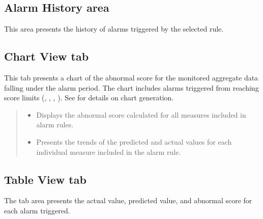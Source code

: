 \documentclass[letterpaper,10pt,english]{sphinxmanual}
\begin{document}
\subsection{Alarm History area}
\label{\detokenize{anomaly/part05/index:alarm-history}}
This area presents the history of alarms triggered by the selected rule.
\begin{quote}

\begin{figure}[H]
\centering

\noindent{}
\end{figure}
\end{quote}


\subsection{Chart View tab}
\label{\detokenize{anomaly/part05/index:chart-view}}
This tab presents a chart of the abnormal score for the monitored aggregate data falling under the alarm period. The chart includes alarms triggered from reaching score limits (, , , ). See {\hyperref[\detokenize{anomaly/part01/index:basic-principles}]{}} for details on chart generation.
\begin{quote}

\begin{figure}[H]
\centering

\noindent{}
\end{figure}
\begin{itemize}
\item {} 
 Displays the abnormal score calculated for all measures included in alarm rules.

\item {} 
 Presents the trends of the predicted and actual values for each individual measure included in the alarm rule.

\end{itemize}
\end{quote}


\subsection{Table View tab}
\label{\detokenize{anomaly/part05/index:table-view}}
The tab area presents the actual value, predicted value, and abnormal score for each alarm triggered.
\begin{quote}

\begin{figure}[H]
\centering

\noindent{}
\end{figure}
\end{quote}



\renewcommand{\indexname}{Index}
\printindex
\end{document}
